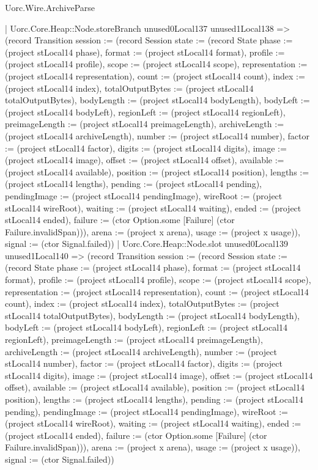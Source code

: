 \begin{lexlean}{Uorc.Wire.ArchiveParse}
\begin{semanticmodule}
{            | Uorc.Core.Heap::Node.storeBranch unused0Local137 unused1Local138 => (record Transition {session := (record Session {state := (record State {phase := (project stLocal14 phase), format := (project stLocal14 format), profile := (project stLocal14 profile), scope := (project stLocal14 scope), representation := (project stLocal14 representation), count := (project stLocal14 count), index := (project stLocal14 index), totalOutputBytes := (project stLocal14 totalOutputBytes), bodyLength := (project stLocal14 bodyLength), bodyLeft := (project stLocal14 bodyLeft), regionLeft := (project stLocal14 regionLeft), preimageLength := (project stLocal14 preimageLength), archiveLength := (project stLocal14 archiveLength), number := (project stLocal14 number), factor := (project stLocal14 factor), digits := (project stLocal14 digits), image := (project stLocal14 image), offset := (project stLocal14 offset), available := (project stLocal14 available), position := (project stLocal14 position), lengths := (project stLocal14 lengths), pending := (project stLocal14 pending), pendingImage := (project stLocal14 pendingImage), wireRoot := (project stLocal14 wireRoot), waiting := (project stLocal14 waiting), ended := (project stLocal14 ended), failure := (ctor Option.some [Failure] (ctor Failure.invalidSpan))}), arena := (project x arena), usage := (project x usage)}), signal := (ctor Signal.failed)})
            | Uorc.Core.Heap::Node.slot unused0Local139 unused1Local140 => (record Transition {session := (record Session {state := (record State {phase := (project stLocal14 phase), format := (project stLocal14 format), profile := (project stLocal14 profile), scope := (project stLocal14 scope), representation := (project stLocal14 representation), count := (project stLocal14 count), index := (project stLocal14 index), totalOutputBytes := (project stLocal14 totalOutputBytes), bodyLength := (project stLocal14 bodyLength), bodyLeft := (project stLocal14 bodyLeft), regionLeft := (project stLocal14 regionLeft), preimageLength := (project stLocal14 preimageLength), archiveLength := (project stLocal14 archiveLength), number := (project stLocal14 number), factor := (project stLocal14 factor), digits := (project stLocal14 digits), image := (project stLocal14 image), offset := (project stLocal14 offset), available := (project stLocal14 available), position := (project stLocal14 position), lengths := (project stLocal14 lengths), pending := (project stLocal14 pending), pendingImage := (project stLocal14 pendingImage), wireRoot := (project stLocal14 wireRoot), waiting := (project stLocal14 waiting), ended := (project stLocal14 ended), failure := (ctor Option.some [Failure] (ctor Failure.invalidSpan))}), arena := (project x arena), usage := (project x usage)}), signal := (ctor Signal.failed)})
}
\end{semanticmodule}
\end{lexlean}
